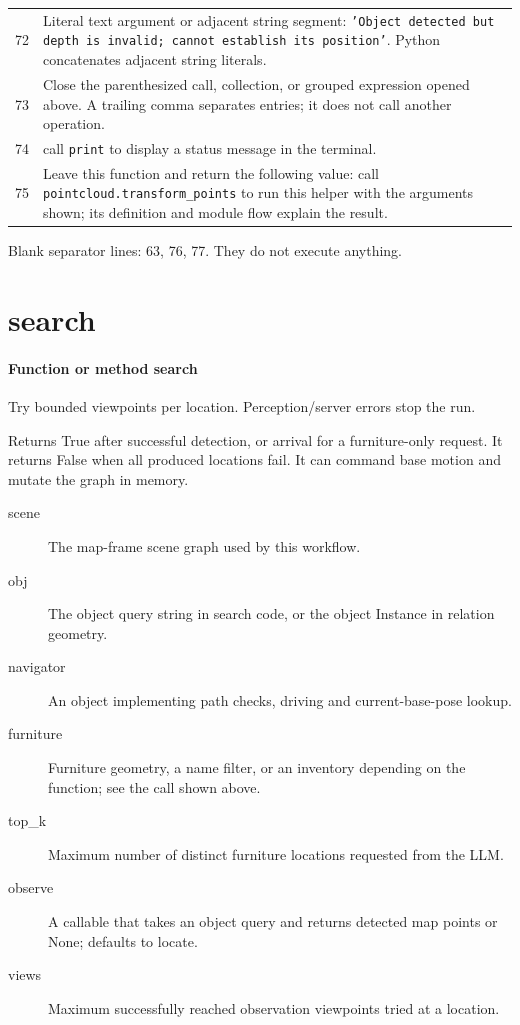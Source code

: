 \documentclass[11pt,a4paper]{book}
\begin{document}
\begin{longtable}{r p{}}
72 & Literal text argument or adjacent string segment: \texttt{'Object detected but depth is invalid; cannot establish its position'}. Python concatenates adjacent string literals. \\

73 & Close the parenthesized call, collection, or grouped expression opened above. A trailing comma separates entries; it does not call another operation. \\

74 & call \texttt{print} to display a status message in the terminal. \\

75 & Leave this function and return the following value: call \texttt{pointcloud.transform\_points} to run this helper with the arguments shown; its definition and module flow explain the result. \\

\end{longtable}

Blank separator lines: 63, 76, 77. They do not execute anything.

\section{search}

\paragraph{Function or method search}
Try bounded viewpoints per location. Perception/server errors stop the run.

Returns True after successful detection, or arrival for a furniture-only request. It returns False when all produced locations fail. It can command base motion and mutate the graph in memory.

\begin{description}
\item[scene] The map-frame scene graph used by this workflow.
\item[obj] The object query string in search code, or the object Instance in relation geometry.
\item[navigator] An object implementing path checks, driving and current-base-pose lookup.
\item[furniture] Furniture geometry, a name filter, or an inventory depending on the function; see the call shown above.
\item[top\_k] Maximum number of distinct furniture locations requested from the LLM.
\item[observe] A callable that takes an object query and returns detected map points or None; defaults to locate.
\item[views] Maximum successfully reached observation viewpoints tried at a location.
\end{description}
\end{document}
